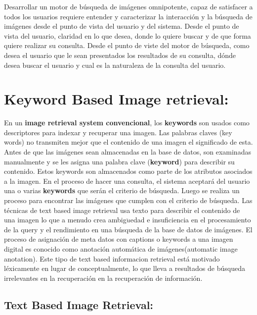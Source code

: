 \documentclass{llncs}
\begin{document}
Desarrollar un motor de búsqueda de imágenes omnipotente, capaz de satisfacer a todos los usuarios 
requiere entender y caracterizar la interacción y la búsqueda de imágenes desde el punto de vista 
del usuario y del sistema. Desde el punto de vista del usuario, claridad en lo que desea, donde lo 
quiere buscar y de que forma quiere realizar su consulta. Desde el punto de viste del motor de 
búsqueda, como desea el usuario que le sean presentados los resultados de su consulta, dónde desea 
buscar el usuario y cual es la naturaleza de la consulta del usuario.

\section{Keyword Based Image retrieval:}

En un \textbf{image retrieval system convencional}, los \textbf{keywords} son 
usados como descriptores para indexar y recuperar una imagen.  Las palabras 
claves (key words) no transmiten mejor que el contenido de una imagen 
el significado de esta. Antes de que las imágenes sean almacenadas en la base de datos, son examinadas 
manualmente y se les asigna una palabra  clave (\textbf{keyword}) para describir su 
contenido. Estos  keywords  son almacenados como parte de los atributos 
asociados a la imagen. En el proceso de hacer una consulta, el sistema 
aceptará del usuario una o varias \textbf{keywords} que serán el criterio de búsqueda.
Luego se realiza un proceso para encontrar las imágenes que cumplen con el criterio 
de búsqueda. Las t\'ecnicas de text based image retrieval usa texto para describir el 
contenido de una imagen lo que a menudo crea ambig$\ddot{u}$edad e insuficiencia en el 
procesamiento de la query y el rendimiento en una b\'usqueda de la base de datos de 
im\'agenes. El proceso de asignaci\'on de meta datos con captions o keywords a una imagen
digital es conocido como anotaci\'on autom\'atica de im\'agenes(automatic image anotation).
Este tipo de text based informacion retrieval est\'a motivado l\'exicamente en lugar de 
conceptualmente, lo que lleva a resultados de b\'usqueda irrelevantes en la recuperaci\'on en la 
recuperaci\'on de informaci\'on.

\subsection{Text Based Image Retrieval:}
\end{document}
